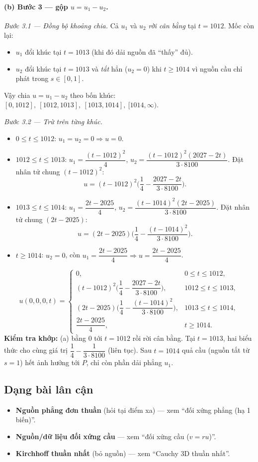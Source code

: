 \paragraph{(b) Bước 3 --- gộp $u=u_1-u_2$.}\leavevmode

\emph{Bước 3.1 --- Đồng bộ khoảng chia.} Cả $u_1$ và $u_2$ \emph{rời cân bằng} tại $t=1012$. Mốc còn lại:
\begin{itemize}
\item $u_1$ đổi khúc tại $t=1013$ (khi đó dải nguồn đã ``thấy'' đủ).
\item $u_2$ đổi khúc tại $t=1013$ và \emph{tắt} hẳn ($u_2=0$) khi $t\ge1014$ vì nguồn cầu chỉ phát trong $s\in[0,1]$.
\end{itemize}
Vậy chia $u=u_1-u_2$ theo bốn khúc: $[0,1012],\ [1012,1013],\ [1013,1014],\ [1014,\infty)$.

\emph{Bước 3.2 --- Trừ trên từng khúc.}
\begin{itemize}
\item $0\le t\le1012$: $u_1=u_2=0\Rightarrow u=0$.
\item $1012\le t\le1013$: $u_1=\dfrac{(t-1012)^2}{4}$, $u_2=\dfrac{(t-1012)^2(2027-2t)}{3\cdot8100}$. Đặt nhân tử chung $(t-1012)^2$:
\[
  u=(t-1012)^2\Big(\dfrac{1}{4}-\dfrac{2027-2t}{3\cdot8100}\Big).
\]
\item $1013\le t\le1014$: $u_1=\dfrac{2t-2025}{4}$, $u_2=\dfrac{(t-1014)^2(2t-2025)}{3\cdot8100}$. Đặt nhân tử chung $(2t-2025)$:
\[
  u=(2t-2025)\Big(\dfrac{1}{4}-\dfrac{(t-1014)^2}{3\cdot8100}\Big).
\]
\item $t\ge1014$: $u_2=0$, còn $u_1=\dfrac{2t-2025}{4}\Rightarrow u=\dfrac{2t-2025}{4}$.
\end{itemize}

\begin{nhobox}
\[
  u(0,0,0,t)=\begin{cases}
    0,& 0\le t\le1012,\\[2pt]
    (t-1012)^2\Big(\dfrac14-\dfrac{2027-2t}{3\cdot8100}\Big),& 1012\le t\le1013,\\[8pt]
    (2t-2025)\Big(\dfrac14-\dfrac{(t-1014)^2}{3\cdot8100}\Big),& 1013\le t\le1014,\\[8pt]
    \dfrac{2t-2025}{4},& t\ge1014.
  \end{cases}
\]
\textbf{Kiểm tra khớp:} (a) bằng $0$ tới $t=1012$ rồi rời cân bằng. Tại $t=1013$, hai biểu thức cho cùng giá trị $\dfrac{1}{4}-\dfrac{1}{3\cdot8100}$ (liên tục). Sau $t=1014$ quả cầu (nguồn tắt từ $s=1$) hết ảnh hưởng tới $P$, chỉ còn phần dải phẳng $u_1$.
\end{nhobox}

\subsection*{Dạng bài lân cận}
\begin{itemize}
\item \textbf{Nguồn phẳng đơn thuần} (hỏi tại điểm xa) --- xem ``đối xứng phẳng (hạ 1 biến)''.
\item \textbf{Nguồn/dữ liệu đối xứng cầu} --- xem ``đối xứng cầu ($v=ru$)''.
\item \textbf{Kirchhoff thuần nhất} (bỏ nguồn) --- xem ``Cauchy 3D thuần nhất''.
\end{itemize}
